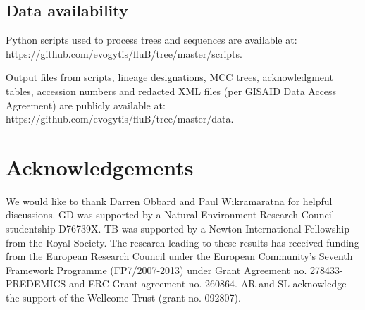 \documentclass[11pt,oneside,letterpaper]{article}
\begin{document}
\subsection*{Data availability}
Python scripts used to process trees and sequences are available at:
\\https://github.com/evogytis/fluB/tree/master/scripts.

Output files from scripts, lineage designations, MCC trees, acknowledgment tables, accession numbers and redacted XML files (per GISAID Data Access Agreement) are publicly available at:
\\https://github.com/evogytis/fluB/tree/master/data.

\section*{Acknowledgements}
We would like to thank Darren Obbard and Paul Wikramaratna for helpful discussions.
GD was supported by a Natural Environment Research Council studentship D76739X.
TB was supported by a Newton International Fellowship from the Royal Society. 
The research leading to these results has received funding from the European Research Council under the European Community's Seventh Framework Programme (FP7/2007-2013) under Grant Agreement no. 278433-PREDEMICS and ERC Grant agreement no. 260864.
AR and SL acknowledge the support of the Wellcome Trust (grant no. 092807).



\end{document}
